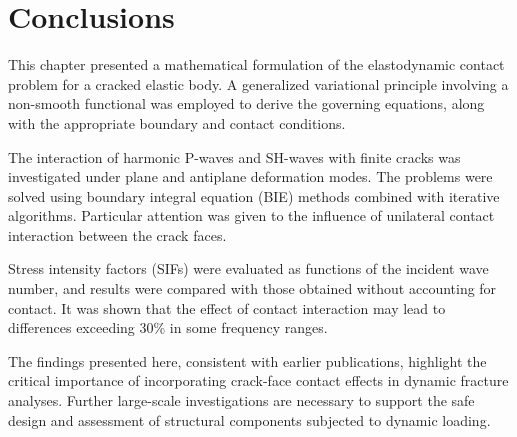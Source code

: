 \section{Conclusions}

This chapter presented a mathematical formulation of the elastodynamic contact problem for a cracked elastic body. A generalized variational principle involving a non-smooth functional was employed to derive the governing equations, along with the appropriate boundary and contact conditions.

The interaction of harmonic P-waves and SH-waves with finite cracks was investigated under plane and antiplane deformation modes. The problems were solved using boundary integral equation (BIE) methods combined with iterative algorithms. Particular attention was given to the influence of unilateral contact interaction between the crack faces.

Stress intensity factors (SIFs) were evaluated as functions of the incident wave number, and results were compared with those obtained without accounting for contact. It was shown that the effect of contact interaction may lead to differences exceeding 30\% in some frequency ranges.

The findings presented here, consistent with earlier publications, highlight the critical importance of incorporating crack-face contact effects in dynamic fracture analyses. Further large-scale investigations are necessary to support the safe design and assessment of structural components subjected to dynamic loading.





